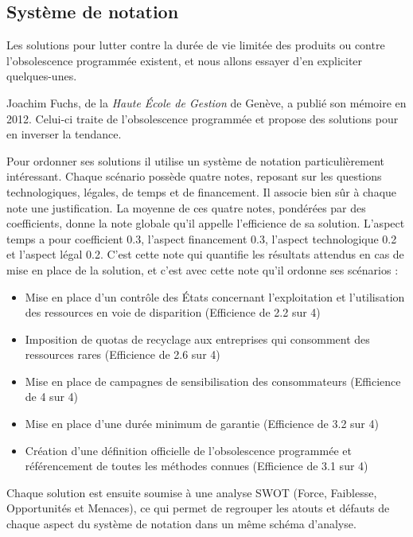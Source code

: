 \subsection{Système de notation}

Les solutions pour lutter contre la durée de vie limitée des produits ou contre l’obsolescence programmée existent, et nous allons essayer d’en expliciter quelques-unes.

Joachim Fuchs, de la \textit{Haute École de Gestion} de Genève, a publié son mémoire en 2012. Celui-ci traite de l'obsolescence programmée et propose des solutions pour en inverser la tendance.



Pour ordonner ses solutions il utilise un système de notation particulièrement intéressant. Chaque scénario possède quatre notes, reposant sur les questions technologiques, légales, de temps et de financement. Il associe bien sûr à chaque note une justification.
La moyenne de ces quatre notes, pondérées par des coefficients, donne la note globale qu’il appelle l’efficience de sa solution. L’aspect temps a pour coefficient 0.3, l’aspect financement 0.3, l’aspect technologique 0.2 et l’aspect légal 0.2. C’est cette note qui quantifie les résultats attendus en cas de mise en place de la solution, et c’est avec cette note qu’il ordonne ses scénarios :

\begin{itemize}
\item Mise en place d’un contrôle des États concernant l’exploitation et l’utilisation des ressources en voie de disparition (Efficience de 2.2 sur 4)
\item Imposition de quotas de recyclage aux entreprises qui consomment des ressources rares (Efficience de 2.6 sur 4)
\item Mise en place de campagnes de sensibilisation des consommateurs (Efficience de 4 sur 4)
\item Mise en place d’une durée minimum de garantie (Efficience de 3.2 sur 4)
\item Création d’une définition officielle de l’obsolescence programmée et référencement de toutes les méthodes connues (Efficience de 3.1 sur 4)
\end{itemize}

Chaque solution est ensuite soumise à une analyse SWOT (Force, Faiblesse, Opportunités et Menaces), ce qui permet de regrouper les atouts et défauts de chaque aspect du système de notation dans un même schéma d’analyse. 
